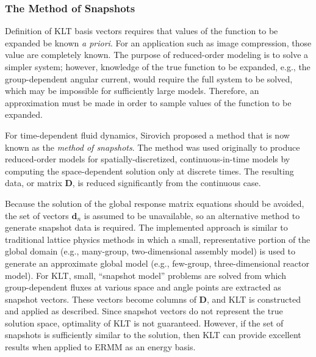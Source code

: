 \documentclass[5p,times,twocolumn,10pt]{elsarticle}
\begin{document}
  
  
  \subsubsection{The Method of Snapshots}
  
  
  Definition of KLT basis vectors requires that values of the function to be 
  expanded be known {\it a priori}.  For an application such as image compression,
  those value are completely known.  The purpose of reduced-order modeling is to
  solve a simpler system; however, knowledge of the true function to be expanded,
  e.g., the group-dependent angular current, would require the full system 
  to be solved, which may be impossible for sufficiently large models.  
  Therefore, an approximation must be made in order to sample 
  values of the function to be expanded.  
  
  For  time-dependent fluid dynamics,
  Sirovich proposed a method\cite{Sirovich1987} that is now 
  known as the {\it method of snapshots}\cite{Buchan2013}.  
  The method was used originally to produce 
  reduced-order models for spatially-discretized, continuous-in-time 
  models by computing the space-dependent solution only at discrete times. 
  The resulting data, or matrix $\mathbf{D}$, is reduced significantly 
  from the continuous case.
  
  Because the solution of the global response matrix equations should be avoided, 
  the set of vectors $\mathbf{d}_n$ is assumed to be unavailable, so
  an alternative method to generate snapshot data is required. The implemented
  approach is similar to traditional lattice physics methods in which 
  a small, representative portion of the global domain (e.g., many-group, 
  two-dimensional assembly model) is used to generate 
  an approximate global model (e.g., few-group, three-dimensional
  reactor model).  For KLT, small, ``snapshot model'' problems 
  are solved from which group-dependent fluxes at various space and angle 
  points are extracted as snapshot vectors.  These vectors become 
  columns of $\mathbf{D}$, and KLT is constructed and applied as
  described.  Since snapshot vectors do not represent the 
  true solution space, optimality of KLT is not guaranteed.
  However, if the set of snapshots is sufficiently similar to the 
  solution, then KLT can provide excellent results when applied
  to ERMM as an energy basis.  
  
\end{document}
